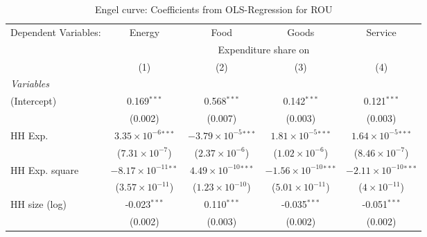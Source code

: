 
\begin{table}[htbp!]
   \centering
   \small
   \begin{adjustbox}{width = 1\textwidth, max height = 0.95\textheight, center}
      \begin{threeparttable}[b]
         \caption{\label{tab:Engel_parametric_ROU} Engel curve: Coefficients from OLS-Regression for ROU}
         \begin{tabular}{lcccc}
            \tabularnewline \midrule \midrule
            Dependent Variables: & Energy                         & Food                           & Goods                           & Service\\  
             & \multicolumn{4}{c}{Expenditure share on} \\ 
                                 & (1)                            & (2)                            & (3)                             & (4)\\  
            \midrule
            \emph{Variables}\\
            (Intercept)          & 0.169$^{***}$                  & 0.568$^{***}$                  & 0.142$^{***}$                   & 0.121$^{***}$\\   
                                 & (0.002)                        & (0.007)                        & (0.003)                         & (0.003)\\   
            HH Exp.              & $3.35\times 10^{-6}$$^{***}$   & $-3.79\times 10^{-5}$$^{***}$  & $1.81\times 10^{-5}$$^{***}$    & $1.64\times 10^{-5}$$^{***}$\\    
                                 & ($7.31\times 10^{-7}$)         & ($2.37\times 10^{-6}$)         & ($1.02\times 10^{-6}$)          & ($8.46\times 10^{-7}$)\\    
            HH Exp. square       & $-8.17\times 10^{-11}$$^{**}$  & $4.49\times 10^{-10}$$^{***}$  & $-1.56\times 10^{-10}$$^{***}$  & $-2.11\times 10^{-10}$$^{***}$\\    
                                 & ($3.57\times 10^{-11}$)        & ($1.23\times 10^{-10}$)        & ($5.01\times 10^{-11}$)         & ($4\times 10^{-11}$)\\    
            HH size (log)        & -0.023$^{***}$                 & 0.110$^{***}$                  & -0.035$^{***}$                  & -0.051$^{***}$\\   
                                 & (0.002)                        & (0.003)                        & (0.002)                         & (0.002)\\   

\end{tabular}
\end{threeparttable}
\end{adjustbox}
\end{table}
